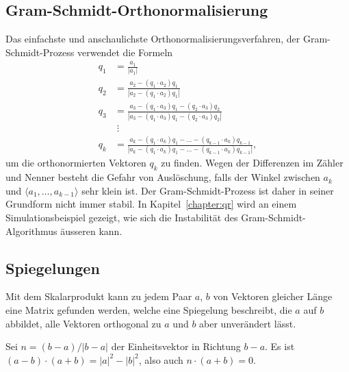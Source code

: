 \subsection{Gram-Schmidt-Orthonormalisierung
\label{buch:subsection:gram-schmidt}}
Das einfachste und anschaulichste Orthonormalisierungsverfahren, der
Gram-Schmidt-Prozess verwendet die Formeln
%
\begin{align*}
q_1 & = \frac{a_1}{|a_1|}
\\
q_2 &= \frac{
a_2 - (q_1\cdot a_2) q_1
}{
|a_2 - (q_1\cdot a_2) q_1|
}
\\
q_3 &= \frac{
a_3 - (q_1\cdot a_3) q_1 - (q_2\cdot a_3) q_2
}{
|a_3 - (q_1\cdot a_3) q_1 - (q_2\cdot a_3) q_2|
}
\\
&\;\vdots\\
q_k
&=\frac{
a_k - (q_1\cdot a_k) q_1 -\dots- (q_{k-1}\cdot a_k) q_{k-1}
}{|
a_k - (q_1\cdot a_k) q_1 -\dots- (q_{k-1}\cdot a_k) q_{k-1}
|},
\end{align*}
um die orthonormierten Vektoren $q_k$ zu finden.
%
Wegen der Differenzen im Zähler und Nenner besteht die Gefahr von
Auslöschung, falls der Winkel zwischen $a_k$ und
$\langle a_1,\dots,a_{k-1}\rangle$ sehr klein ist.
%
Der Gram-Schmidt-Prozess ist daher in seiner Grundform nicht immer stabil.
In Kapitel~\ref{chapter:qr} wird an einem Simulationsbeispiel gezeigt,
wie sich die Instabilität des Gram-Schmidt-Algorithmus äusseren kann.

\subsection{Spiegelungen
\label{buch:subsection:spiegelungn}}
Mit dem Skalarprodukt kann zu jedem Paar $a$, $b$ von Vektoren 
gleicher Länge eine Matrix gefunden werden, welche eine Spiegelung
beschreibt, die $a$ auf $b$ abbildet, alle Vektoren orthogonal zu
$a$ und $b$ aber unverändert lässt.
%
%

Sei $n=(b-a)/|b-a|$ der Einheitsvektor in Richtung $b-a$.
Es ist $(a-b)\cdot (a+b) = |a|^2 - |b|^2$, also auch $n\cdot (a+b)=0$.
%

